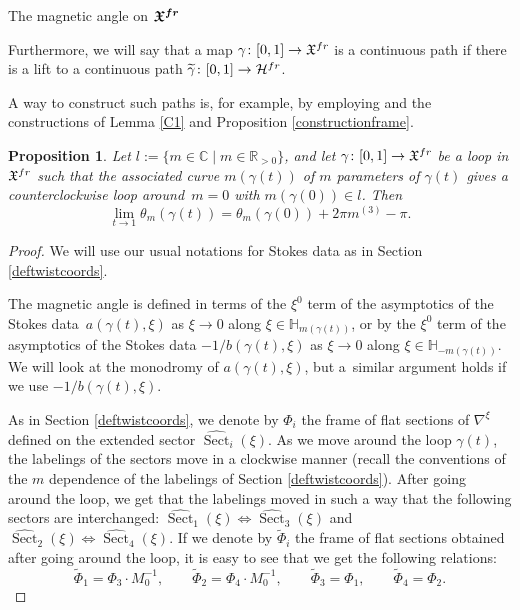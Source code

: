 \documentclass[11pt]{article}
\numberwithin{equation}{section}
\newtheorem{Proposition}[Theorem]{Proposition}
 { \theoremstyle{definition}
\newtheorem{Definition}[Theorem]{Definition}
\newtheorem{Notation}[Theorem]{Notation}
\newtheorem{Example}[Theorem]{Example}
\newtheorem{Remark}[Theorem]{Remark} }
\numberwithin{equation}{section}
\begin{document}
\begin{subsubsection}{The magnetic angle on $\boldsymbol{\mathfrak{X}^{{\rm fr}}}$}
\begin{Definition}
Furthermore, we will say that a map $\gamma\colon [0,1]\to \mathfrak{X}^{\textnormal{fr}}$ is a continuous path if there is a lift to a continuous path $\widetilde{\gamma}\colon [0,1]\to \mathcal{H}^{\textnormal{fr}}$.
\end{Definition}
\begin{Remark} A way to construct such paths is, for example, by employing \cite[Proposition~4.9]{M5} and the constructions of Lemma \ref{C1} and Proposition \ref{constructionframe}.
\end{Remark}
\begin{Proposition} \label{magmon} Let $l:=\{ m\in \mathbb{C} \mid m\in \mathbb{R}_{>0}\}$, and let $\gamma\colon [0,1]\to \mathfrak{X}^{\textnormal{fr}}$ be a loop in $\mathfrak{X}^{\textnormal{fr}}$ such that the associated curve $m(\gamma(t))$ of $m$ parameters of $\gamma(t)$ gives a counterclockwise loop around~${m=0}$ with $m(\gamma(0)) \in l$. Then
\begin{equation*}
 \lim_{t\to 1}\theta_m(\gamma(t))=\theta_m(\gamma(0)) +2\pi m^{(3)}-\pi.
\end{equation*}
\end{Proposition}

\begin{proof}
We will use our usual notations for Stokes data as in Section \ref{deftwistcoords}.

The magnetic angle is defined in terms of the $\xi^0$ term of the asymptotics of the Stokes data~${a(\gamma(t),\xi)}$ as $\xi \to 0$ along $\xi \in \mathbb{H}_{m(\gamma(t))}$, or by the $\xi^{0}$ term of the asymptotics of the Stokes data $-1/b(\gamma(t),\xi)$ as $\xi \to 0$ along $\xi \in \mathbb{H}_{-m(\gamma(t))}$. We will look at the monodromy of $a(\gamma(t),\xi)$, but a~similar argument holds if we use $-1/b(\gamma(t),\xi)$.

As in Section \ref{deftwistcoords}, we denote by $\Phi_i$ the frame of flat sections of $\nabla^{\xi}$ defined on the extended sector $\widehat{\operatorname{Sect}}_i(\xi)$. As we move around the loop $\gamma(t)$, the labelings of the sectors move in a clockwise manner (recall the conventions of the $m$ dependence of the labelings of Section \ref{deftwistcoords}). After going around the loop, we get that the labelings moved in such a way that the following sectors are interchanged: $\widehat{\operatorname{Sect}}_1(\xi) \iff \widehat{\operatorname{Sect}}_3(\xi)$ and $\widehat{\operatorname{Sect}}_2(\xi) \iff \widehat{\operatorname{Sect}}_4(\xi)$. If we denote by $\widetilde{\Phi}_i$ the frame of flat sections obtained after going around the loop, it is easy to see that we get the following relations:
\begin{equation}\label{mmonodromy}
 \widetilde{\Phi}_1 = \Phi_3 \cdot M_0^{-1},\qquad
 \widetilde{\Phi}_2= \Phi_4 \cdot M_0^{-1},\qquad
 \widetilde{\Phi}_3= \Phi_1,\qquad
 \widetilde{\Phi}_4 = \Phi_2.
\end{equation}


\end{proof}
\end{subsubsection}
\end{document}
